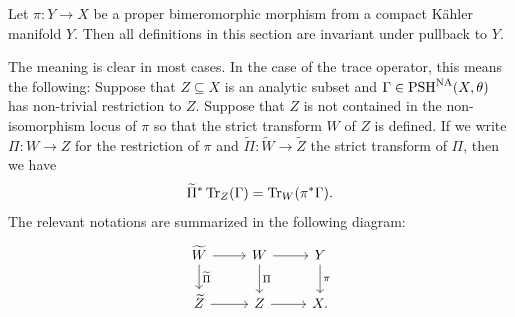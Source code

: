 \begin{proposition}\label{prop:NApotential:L655}
    Let $\pi\colon Y\rightarrow X$ be a proper bimeromorphic morphism from a compact K\"ahler manifold $Y$. Then all definitions in this section are invariant under pullback to $Y$.
\end{proposition}
The meaning is clear in most cases. In the case of the trace operator, this means the following: Suppose that $Z\subseteq X$ is an analytic subset and $\Gamma\in \mathrm{PSH}^{\mathrm{NA}}(X,\theta)$ has non-trivial restriction to $Z$. Suppose that $Z$ is not contained in the non-isomorphism locus of $\pi$ so that the strict transform $W$ of $Z$ is defined. If we write $\Pi\colon W\rightarrow Z$ for the restriction of $\pi$ and $\widetilde{\Pi}\colon \widetilde{W}\rightarrow \widetilde{Z}$ the strict transform of $\Pi$, then we have
\[
    \widetilde{\Pi}^* \operatorname{Tr}_Z(\Gamma)=\operatorname{Tr}_W(\pi^*\Gamma).
\]
The relevant notations are summarized in the following diagram:
\[
\begin{tikzcd}
\widetilde{W} \arrow[r] \arrow[d, "\widetilde{\Pi}"] & W \arrow[r] \arrow[d, "\Pi"] & Y \arrow[d, "\pi"] \\
\widetilde{Z} \arrow[r]                          & Z \arrow[r]                  & X.
\end{tikzcd}
\]
